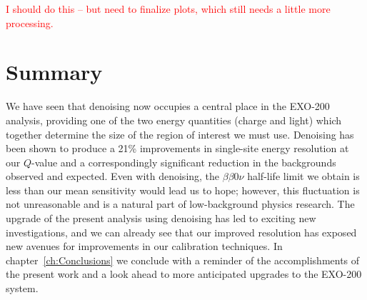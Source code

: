 \textcolor{red}{I should do this -- but need to finalize plots, which still needs a little more processing.}

\section{Summary}\label{sec:ResultSummary}

We have seen that denoising now occupies a central place in the EXO-200 analysis, providing one of the two energy quantities (charge and light) which together determine the size of the region of interest we must use.  Denoising has been shown to produce a 21\% improvements in single-site energy resolution at our $Q$-value and a correspondingly significant reduction in the backgrounds observed and expected.  Even with denoising, the $\beta\beta 0\nu$ half-life limit we obtain is less than our mean sensitivity would lead us to hope; however, this fluctuation is not unreasonable and is a natural part of low-background physics research.  The upgrade of the present analysis using denoising has led to exciting new investigations, and we can already see that our improved resolution has exposed new avenues for improvements in our calibration techniques.  In chapter~\ref{ch:Conclusions} we conclude with a reminder of the accomplishments of the present work and a look ahead to more anticipated upgrades to the EXO-200 system.

